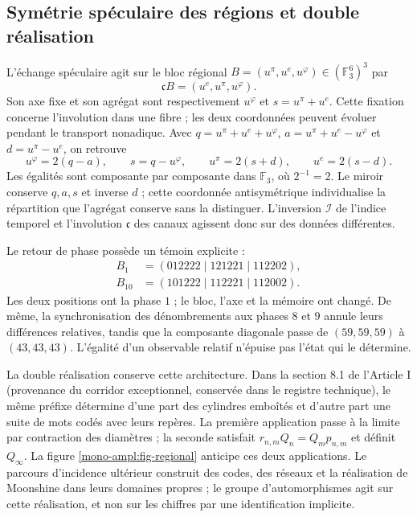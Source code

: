\subsection{Symétrie spéculaire des régions et double réalisation}
\label{mono-ampl:regiones}

L'échange spéculaire agit sur le bloc régional
\(B=(u^\pi,u^e,u^\varphi)\in(\mathbb F_3^6)^3\) par
\[
 \mathfrak cB=(u^e,u^\pi,u^\varphi).
\]
Son axe fixe et son agrégat sont respectivement \(u^\varphi\) et
\(s=u^\pi+u^e\). Cette fixation concerne l'involution dans une fibre ;
les deux coordonnées peuvent évoluer pendant le transport nonadique.
Avec \(q=u^\pi+u^e+u^\varphi\),
\(a=u^\pi+u^e-u^\varphi\) et \(d=u^\pi-u^e\), on retrouve
\[
 u^\varphi=2(q-a),\qquad s=q-u^\varphi,\qquad
 u^\pi=2(s+d),\qquad u^e=2(s-d).
\]
Les égalités sont composante par composante dans \(\mathbb F_3\), où
\(2^{-1}=2\). Le miroir conserve \(q,a,s\) et inverse \(d\) ; cette
coordonnée antisymétrique individualise la répartition que l'agrégat conserve
sans la distinguer. L'inversion \(\mathcal I\) de l'indice temporel et
l'involution \(\mathfrak c\) des canaux agissent donc sur des
données différentes.

Le retour de phase possède un témoin explicite :
\[
 \begin{aligned}
 B_1&=(012222\mid121221\mid112202),\\
 B_{10}&=(101222\mid112221\mid112002).
 \end{aligned}
\]
Les deux positions ont la phase \(1\) ; le bloc, l'axe et la mémoire ont
changé. De même, la synchronisation des dénombrements aux phases \(8\) et
\(9\) annule leurs différences relatives, tandis que la composante diagonale
passe de \((59,59,59)\) à \((43,43,43)\). L'égalité d'un observable
relatif n'épuise pas l'état qui le détermine.

La double réalisation conserve cette architecture. Dans la section 8.1 de l'Article I (provenance du corridor exceptionnel, conservée dans le registre technique), le même préfixe détermine d'une part des cylindres emboîtés et d'autre part une suite de mots codés avec leurs repères. La première application passe à la limite par contraction des diamètres ; la seconde satisfait \(r_{n,m}Q_n=Q_mp_{n,m}\) et définit \(Q_\infty\). La figure \ref{mono-ampl:fig-regional} anticipe ces deux applications. Le parcours d'incidence ultérieur construit des codes, des réseaux et la réalisation de Moonshine dans leurs domaines propres ; le groupe d'automorphismes agit sur cette réalisation, et non sur les chiffres par une identification implicite.




